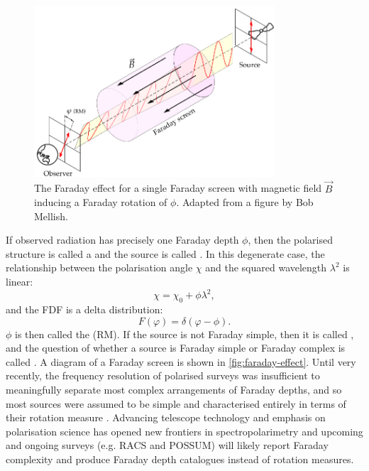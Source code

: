         \begin{figure}
            \centering
            \includegraphics[width=0.8\textwidth]{images/Faraday-effect.eps}
            \caption[A Faraday screen.]{\label{fig:faraday-effect} The Faraday effect for a single Faraday screen with magnetic field $\vec B$ inducing a Faraday rotation of $\phi$. Adapted from a figure by Bob Mellish.}
        \end{figure}

        If observed radiation has precisely one Faraday depth $\phi$, then the polarised structure is called a  and the source is called . In this degenerate case, the relationship between the polarisation angle $\chi$ and the squared wavelength $\lambda^2$ is linear:
        \begin{equation}
            \chi = \chi_0 + \phi \lambda^2,
        \end{equation}
        and the FDF is a delta distribution:
        \begin{equation}
            F(\varphi) = \delta(\varphi - \phi).
        \end{equation}
        $\phi$ is then called the  (RM). If the source is not Faraday simple, then it is called , and the question of whether a source is Faraday simple or Faraday complex is called . A diagram of a Faraday screen is shown in \autoref{fig:faraday-effect}. Until very recently, the frequency resolution of polarised surveys was insufficient to meaningfully separate most complex arrangements of Faraday depths, and so most sources were assumed to be simple and characterised entirely in terms of their rotation measure \citep[e.g.][]{taylor_rotation_2009}. Advancing telescope technology and emphasis on polarisation science has opened new frontiers in spectropolarimetry and upcoming and ongoing surveys (e.g. RACS and POSSUM) will likely report Faraday complexity and produce Faraday depth catalogues instead of rotation measures.

